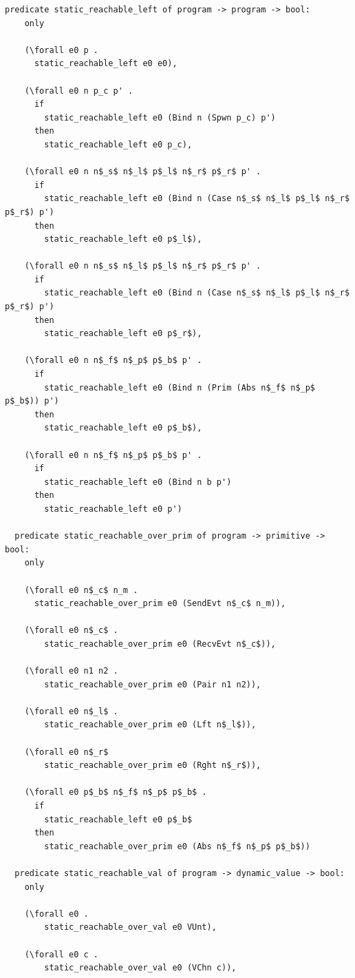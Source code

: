 \documentclass[10pt]{article}
\begin{document}
\begin{lstlisting}[language=logic, mathescape]
  predicate static_reachable_left of program -> program -> bool:
    only

    (\forall e0 p .
      static_reachable_left e0 e0),

    (\forall e0 n p_c p' .
      if 
        static_reachable_left e0 (Bind n (Spwn p_c) p')
      then
        static_reachable_left e0 p_c),

    (\forall e0 n n$_s$ n$_l$ p$_l$ n$_r$ p$_r$ p' .
      if
        static_reachable_left e0 (Bind n (Case n$_s$ n$_l$ p$_l$ n$_r$ p$_r$) p')
      then
        static_reachable_left e0 p$_l$),

    (\forall e0 n n$_s$ n$_l$ p$_l$ n$_r$ p$_r$ p' .
      if
        static_reachable_left e0 (Bind n (Case n$_s$ n$_l$ p$_l$ n$_r$ p$_r$) p')
      then
        static_reachable_left e0 p$_r$),

    (\forall e0 n n$_f$ n$_p$ p$_b$ p' .
      if
        static_reachable_left e0 (Bind n (Prim (Abs n$_f$ n$_p$ p$_b$)) p')
      then
        static_reachable_left e0 p$_b$),

    (\forall e0 n n$_f$ n$_p$ p$_b$ p' .
      if
        static_reachable_left e0 (Bind n b p')
      then
        static_reachable_left e0 p')

  predicate static_reachable_over_prim of program -> primitive -> bool:
    only

    (\forall e0 n$_c$ n_m .
      static_reachable_over_prim e0 (SendEvt n$_c$ n_m)),

    (\forall e0 n$_c$ .
        static_reachable_over_prim e0 (RecvEvt n$_c$)),

    (\forall e0 n1 n2 .
        static_reachable_over_prim e0 (Pair n1 n2)),

    (\forall e0 n$_l$ .
        static_reachable_over_prim e0 (Lft n$_l$)),

    (\forall e0 n$_r$
        static_reachable_over_prim e0 (Rght n$_r$)),

    (\forall e0 p$_b$ n$_f$ n$_p$ p$_b$ . 
      if
        static_reachable_left e0 p$_b$ 
      then
        static_reachable_over_prim e0 (Abs n$_f$ n$_p$ p$_b$))

  predicate static_reachable_val of program -> dynamic_value -> bool:
    only

    (\forall e0 .
        static_reachable_over_val e0 VUnt),

    (\forall e0 c .
        static_reachable_over_val e0 (VChn c)),


\end{lstlisting}
\end{document}
